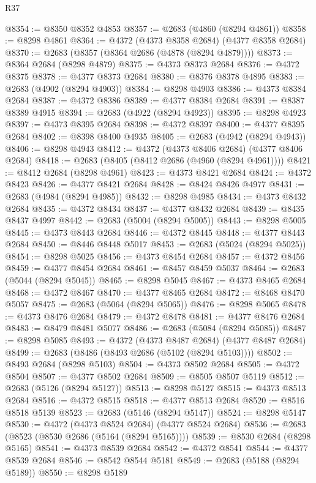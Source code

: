 \begin{lexlean}{R37}
\begin{coremodule}
@8354 := @8350 @8352 @4853
@8357 := @2683 (@4860 (@8294 @4861))
@8358 := @8298 @4861
@8364 := @4372 (@4373 @8358 @2684) (@4377 @8358 @2684)
@8370 := @2683 (@8357 (@8364 @2686 (@4878 (@8294 @4879))))
@8373 := @8364 @2684 (@8298 @4879)
@8375 := @4373 @8373 @2684
@8376 := @4372 @8375
@8378 := @4377 @8373 @2684
@8380 := @8376 @8378 @4895
@8383 := @2683 (@4902 (@8294 @4903))
@8384 := @8298 @4903
@8386 := @4373 @8384 @2684
@8387 := @4372 @8386
@8389 := @4377 @8384 @2684
@8391 := @8387 @8389 @4915
@8394 := @2683 (@4922 (@8294 @4923))
@8395 := @8298 @4923
@8397 := @4373 @8395 @2684
@8398 := @4372 @8397
@8400 := @4377 @8395 @2684
@8402 := @8398 @8400 @4935
@8405 := @2683 (@4942 (@8294 @4943))
@8406 := @8298 @4943
@8412 := @4372 (@4373 @8406 @2684) (@4377 @8406 @2684)
@8418 := @2683 (@8405 (@8412 @2686 (@4960 (@8294 @4961))))
@8421 := @8412 @2684 (@8298 @4961)
@8423 := @4373 @8421 @2684
@8424 := @4372 @8423
@8426 := @4377 @8421 @2684
@8428 := @8424 @8426 @4977
@8431 := @2683 (@4984 (@8294 @4985))
@8432 := @8298 @4985
@8434 := @4373 @8432 @2684
@8435 := @4372 @8434
@8437 := @4377 @8432 @2684
@8439 := @8435 @8437 @4997
@8442 := @2683 (@5004 (@8294 @5005))
@8443 := @8298 @5005
@8445 := @4373 @8443 @2684
@8446 := @4372 @8445
@8448 := @4377 @8443 @2684
@8450 := @8446 @8448 @5017
@8453 := @2683 (@5024 (@8294 @5025))
@8454 := @8298 @5025
@8456 := @4373 @8454 @2684
@8457 := @4372 @8456
@8459 := @4377 @8454 @2684
@8461 := @8457 @8459 @5037
@8464 := @2683 (@5044 (@8294 @5045))
@8465 := @8298 @5045
@8467 := @4373 @8465 @2684
@8468 := @4372 @8467
@8470 := @4377 @8465 @2684
@8472 := @8468 @8470 @5057
@8475 := @2683 (@5064 (@8294 @5065))
@8476 := @8298 @5065
@8478 := @4373 @8476 @2684
@8479 := @4372 @8478
@8481 := @4377 @8476 @2684
@8483 := @8479 @8481 @5077
@8486 := @2683 (@5084 (@8294 @5085))
@8487 := @8298 @5085
@8493 := @4372 (@4373 @8487 @2684) (@4377 @8487 @2684)
@8499 := @2683 (@8486 (@8493 @2686 (@5102 (@8294 @5103))))
@8502 := @8493 @2684 (@8298 @5103)
@8504 := @4373 @8502 @2684
@8505 := @4372 @8504
@8507 := @4377 @8502 @2684
@8509 := @8505 @8507 @5119
@8512 := @2683 (@5126 (@8294 @5127))
@8513 := @8298 @5127
@8515 := @4373 @8513 @2684
@8516 := @4372 @8515
@8518 := @4377 @8513 @2684
@8520 := @8516 @8518 @5139
@8523 := @2683 (@5146 (@8294 @5147))
@8524 := @8298 @5147
@8530 := @4372 (@4373 @8524 @2684) (@4377 @8524 @2684)
@8536 := @2683 (@8523 (@8530 @2686 (@5164 (@8294 @5165))))
@8539 := @8530 @2684 (@8298 @5165)
@8541 := @4373 @8539 @2684
@8542 := @4372 @8541
@8544 := @4377 @8539 @2684
@8546 := @8542 @8544 @5181
@8549 := @2683 (@5188 (@8294 @5189))
@8550 := @8298 @5189

\end{coremodule}
\end{lexlean}
